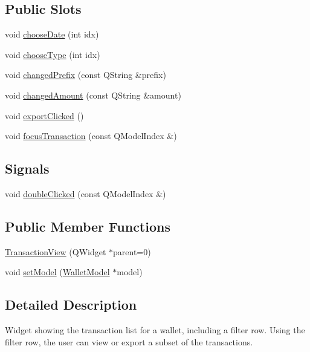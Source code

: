 \subsection*{Public Slots}
\begin{DoxyCompactItemize}
\item 
void \hyperlink{class_transaction_view_abd49a0777b14f7bf5a72a4d5901d033d}{choose\+Date} (int idx)
\item 
void \hyperlink{class_transaction_view_a590f0edc4ab4d59f88d7fc494e852f80}{choose\+Type} (int idx)
\item 
void \hyperlink{class_transaction_view_ac2ed41556913e588c667490860717efa}{changed\+Prefix} (const Q\+String \&prefix)
\item 
void \hyperlink{class_transaction_view_a0075048c06bb54da5c5e5d2691198984}{changed\+Amount} (const Q\+String \&amount)
\item 
void \hyperlink{class_transaction_view_a5983022ff1e5395f87de3c5728eff8da}{export\+Clicked} ()
\item 
void \hyperlink{class_transaction_view_ab6d126806467ae9dc273cbe19a7477cc}{focus\+Transaction} (const Q\+Model\+Index \&)
\end{DoxyCompactItemize}
\subsection*{Signals}
\begin{DoxyCompactItemize}
\item 
void \hyperlink{class_transaction_view_ad7f18fdb4db9a4a307eeba8bf1fec4e3}{double\+Clicked} (const Q\+Model\+Index \&)
\end{DoxyCompactItemize}
\subsection*{Public Member Functions}
\begin{DoxyCompactItemize}
\item 
\hyperlink{class_transaction_view_a0c5e8b90206b4e8b8bf68dd7e319798f}{Transaction\+View} (Q\+Widget $\ast$parent=0)
\item 
void \hyperlink{class_transaction_view_a4920c2cd57d72eb50248948fa160c83c}{set\+Model} (\hyperlink{class_wallet_model}{Wallet\+Model} $\ast$model)
\end{DoxyCompactItemize}


\subsection{Detailed Description}
Widget showing the transaction list for a wallet, including a filter row. Using the filter row, the user can view or export a subset of the transactions. 

